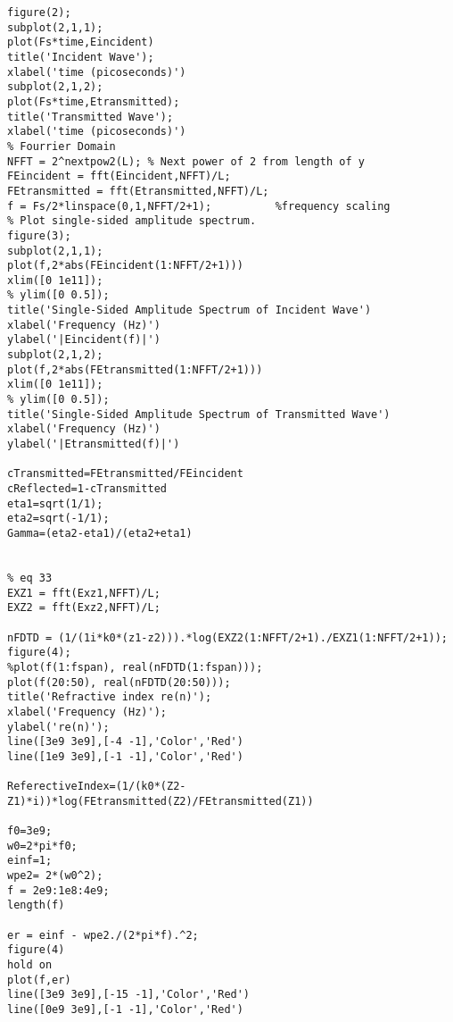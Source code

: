 \begin{lstlisting}
figure(2);
subplot(2,1,1);
plot(Fs*time,Eincident)
title('Incident Wave');
xlabel('time (picoseconds)')
subplot(2,1,2);
plot(Fs*time,Etransmitted);
title('Transmitted Wave');
xlabel('time (picoseconds)')
% Fourrier Domain
NFFT = 2^nextpow2(L); % Next power of 2 from length of y
FEincident = fft(Eincident,NFFT)/L;
FEtransmitted = fft(Etransmitted,NFFT)/L;
f = Fs/2*linspace(0,1,NFFT/2+1);          %frequency scaling
% Plot single-sided amplitude spectrum.
figure(3);
subplot(2,1,1);
plot(f,2*abs(FEincident(1:NFFT/2+1))) 
xlim([0 1e11]);
% ylim([0 0.5]);
title('Single-Sided Amplitude Spectrum of Incident Wave')
xlabel('Frequency (Hz)')
ylabel('|Eincident(f)|')
subplot(2,1,2);
plot(f,2*abs(FEtransmitted(1:NFFT/2+1)))
xlim([0 1e11]);
% ylim([0 0.5]);
title('Single-Sided Amplitude Spectrum of Transmitted Wave')
xlabel('Frequency (Hz)')
ylabel('|Etransmitted(f)|')

cTransmitted=FEtransmitted/FEincident
cReflected=1-cTransmitted
eta1=sqrt(1/1);
eta2=sqrt(-1/1);
Gamma=(eta2-eta1)/(eta2+eta1)


% eq 33
EXZ1 = fft(Exz1,NFFT)/L;
EXZ2 = fft(Exz2,NFFT)/L;

nFDTD = (1/(1i*k0*(z1-z2))).*log(EXZ2(1:NFFT/2+1)./EXZ1(1:NFFT/2+1));
figure(4);
%plot(f(1:fspan), real(nFDTD(1:fspan)));
plot(f(20:50), real(nFDTD(20:50)));
title('Refractive index re(n)');
xlabel('Frequency (Hz)');
ylabel('re(n)');
line([3e9 3e9],[-4 -1],'Color','Red')
line([1e9 3e9],[-1 -1],'Color','Red')

ReferectiveIndex=(1/(k0*(Z2-Z1)*i))*log(FEtransmitted(Z2)/FEtransmitted(Z1))

f0=3e9;
w0=2*pi*f0;
einf=1;
wpe2= 2*(w0^2);
f = 2e9:1e8:4e9;
length(f)

er = einf - wpe2./(2*pi*f).^2;
figure(4)
hold on
plot(f,er)
line([3e9 3e9],[-15 -1],'Color','Red')
line([0e9 3e9],[-1 -1],'Color','Red')

\end{lstlisting}




